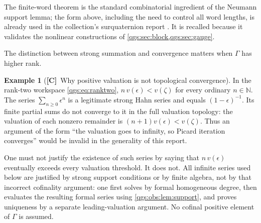 \documentclass[11pt,oneside]{article}
\numberwithin{equation}{section}
\theoremstyle{plain}
\theoremstyle{definition}
\newtheorem{example}[example]{Example}
\theoremstyle{remark}
\newcommand{\N}{\mathbb N}
\newcommand{\TC}{\textcolor{TierC}{\textsf{\bfseries[C]}}}
\begin{document}
The finite-word theorem is the standard combinatorial ingredient of the Neumann support lemma; the form above, including the need to control all word lengths, is already used in the collection's surquaternion report \cite{repoQuaternion}. It is recalled because it validates the nonlinear constructions of \cref{qgs:sec:block,qgs:sec:gauge}.

The distinction between strong summation and convergence matters when $\Gamma$ has higher rank.

\begin{example}[\TC\ Why positive valuation is not topological convergence]\label{qgs:obs:ex:noconv}
In the rank-two workspace \eqref{qgs:eq:ranktwo}, $n\,v(\epsilon)<v(\zeta)$ for every ordinary $n\in\N$. The series $\sum_{n\ge0}\epsilon^n$ is a legitimate strong Hahn series and equals $(1-\epsilon)^{-1}$. Its finite partial sums do not converge to it in the full valuation topology: the valuation of each nonzero remainder is $(n+1)v(\epsilon)<v(\zeta)$. Thus an argument of the form ``the valuation goes to infinity, so Picard iteration converges'' would be invalid in the generality of this report.
\end{example}

One must not justify the existence of such series by saying that $n\,v(\epsilon)$ eventually exceeds every valuation threshold. It does not. All infinite series used below are justified by strong support conditions or by finite algebra, not by that incorrect cofinality argument: one first solves by formal homogeneous degree, then evaluates the resulting formal series using \cref{qgs:obs:lem:support}, and proves uniqueness by a separate leading-valuation argument. No cofinal positive element of $\Gamma$ is assumed.
\end{document}
